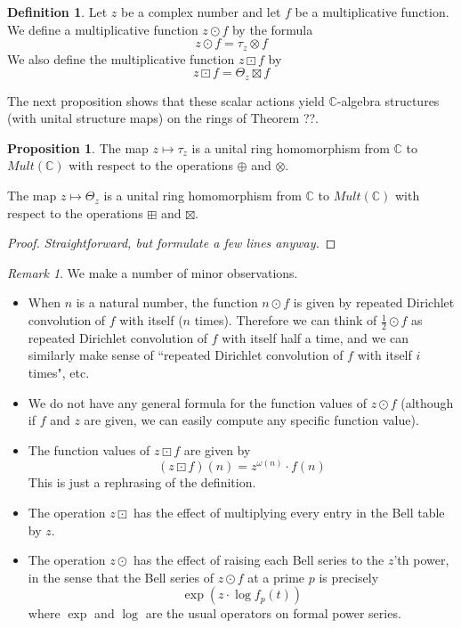 \documentclass[a4paper]{article}
\theoremstyle{definition}
\newtheorem{definition}{Definition}[section]
\newtheorem{proposition}[theorem]{Proposition}
\theoremstyle{remark}
\newtheorem*{remark}{Remark}
\newcommand{\C}{\mathbb{C}}
\begin{document}
\begin{definition}
Let $z$ be a complex number and let $f$ be a multiplicative function. We define a multiplicative function $z \odot f$ by the formula
$$  z \odot f = \tau_z \otimes f $$
We also define the multiplicative function $z \boxdot f$ by
$$ z \boxdot f = \Theta_z \boxtimes f  $$
\end{definition}
The next proposition shows that these scalar actions yield $\C$-algebra structures (with unital structure maps) on the rings of Theorem ??. 
\begin{proposition}
The map $z \mapsto \tau_z$ is a unital ring homomorphism from $\C$ to $Mult(\C)$ with respect to the operations $\oplus$ and $\otimes$.

The map $z \mapsto \Theta_z$ is a unital ring homomorphism from $\C$ to $Mult(\C)$ with respect to the operations $\boxplus$ and $\boxtimes$.
\end{proposition}
\begin{proof}
\emph{Straightforward, but formulate a few lines anyway.}
\end{proof}

\begin{remark}
We make a number of minor observations.
\begin{itemize}
\item When $n$ is a natural number, the function $n \odot f$ is given by repeated Dirichlet convolution of $f$ with itself ($n$ times). Therefore we can think of $\frac{1}{2} \odot f$ as repeated Dirichlet convolution of $f$ with itself half a time, and we can similarly make sense of ``repeated Dirichlet convolution of $f$ with itself $i$ times", etc. 
\item We do not have any general formula for the function values of $z \odot f$ (although if $f$ and $z$ are given, we can easily compute any specific function value). 
\item The function values of $z \boxdot f$ are given by
$$   (z \boxdot f)(n)  = z^{\omega(n)} \cdot f(n) $$ 
This is just a rephrasing of the definition.    
\item The operation $z \boxdot $ has the effect of multiplying every entry in the Bell table by $z$.
\item The operation $z \odot$ has the effect of raising each Bell series to the $z$'th power, in the sense that the Bell series of $z \odot f$ at a prime $p$ is precisely
$$    \exp (z \cdot \log f_p(t))   $$
where $\exp$ and $\log$ are the usual operators on formal power series.
\end{itemize}

\end{remark}
\end{document}
